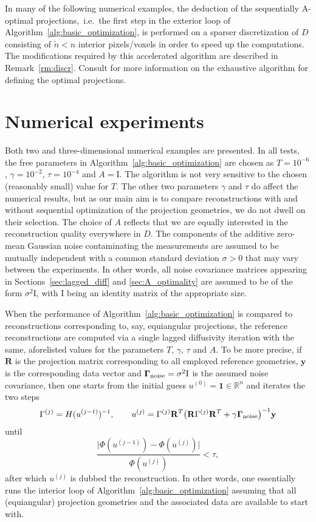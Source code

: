 \documentclass[final]{siamltex}
\newcommand{\R}{\mathbb{R}}
\begin{document}
In many of the following numerical examples, the deduction of the sequentially A-optimal projections,~i.e.~the first step in the exterior loop of Algorithm~\ref{alg:basic_optimization}, is performed on a sparser discretization of $D$ consisting of $\tilde{n} < n$ interior pixels/voxels in order to speed up the computations. The modifications required by this accelerated algorithm are described in Remark~\ref{rm:discr}. Consult \cite{Burger21} for more information on the exhaustive algorithm for defining the optimal projections.


\section{Numerical experiments}
\label{sec:numerics}
Both two and three-dimensional numerical examples are presented. In all tests, the free parameters in Algorithm~\ref{alg:basic_optimization} are chosen as $T = 10^{-6}$, $\gamma = 10^{-2}$, $\tau = 10^{-4}$ and $A = \mathrm{I}$. The algorithm is not very sensitive to the chosen (reasonably small) value for $T$. The other two parameters $\gamma$ and $\tau$ do affect the numerical results, but as our main aim is to compare reconstructions with and without sequential optimization of the projection geometries, we do not dwell on their selection. The choice of $A$ reflects that we are equally interested in the reconstruction quality everywhere in $D$. The components of the additive zero-mean Gaussian noise contaminating the measurements are assumed to be mutually independent with a common standard deviation $\sigma > 0$ that may vary between the experiments. In other words, all noise covariance matrices appearing in
Sections~\ref{sec:lagged_diff} and \ref{sec:A_optimality} are assumed to be of the form $\sigma^2 \mathrm{I}$, with $\mathrm{I}$ being an identity matrix of the appropriate size.

When the performance of Algorithm~\ref{alg:basic_optimization} is compared to reconstructions corresponding to, say, equiangular projections, the reference reconstructions are computed via a single lagged diffusivity iteration with the same, aforelisted values for the parameters $T$, $\gamma$, $\tau$ and $A$. To be more precise, if $\mathbf{R}$ is the projection matrix corresponding to all employed reference geometries, $\mathbf{y}$ is the corresponding data vector and $\bm{\Gamma}_{\rm noise} = \sigma^2 \mathrm{I}$ is the assumed noise covariance, then one starts from the initial guess $u^{(0)} = \mathbf{1} \in \R^n$ and iterates the two steps
 $$
 \Gamma^{(j)} = H(u^{(j-1)})^{-1}, \qquad
 u^{(j)} =  \Gamma^{(j)} \mathbf{R}^T \big(\mathbf{R} \Gamma^{(j)} \mathbf{R}^T + \gamma \bm{\Gamma}_{\rm noise}  \big)^{-1}\mathbf{y}
 $$
 until
 $$
\frac{\big|\Phi(u^{(j-1)}) - \Phi(u^{(j)})\big|}{\Phi(u^{(j)})} < \tau,
$$
after which $u^{(j)}$ is dubbed the reconstruction.
In other words, one essentially runs the interior loop of Algorithm~\ref{alg:basic_optimization} assuming that all (equiangular) projection geometries and the associated data are available to start with.
\end{document}
